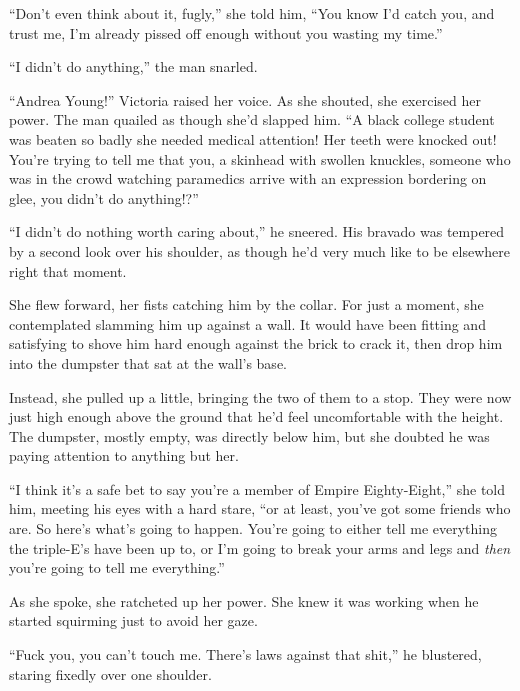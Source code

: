 ``Don't even think about it, fugly,'' she told him, ``You know I'd catch you, and trust me, I'm already pissed off enough without you wasting my time.''



``I didn't do anything,'' the man snarled.



``Andrea Young!'' Victoria raised her voice.  As she shouted, she exercised her power.  The man quailed as though she'd slapped him.  ``A black college student was beaten so badly she needed medical attention!  Her teeth were knocked out!  You're trying to tell me that you, a skinhead with swollen knuckles, someone who was in the crowd watching paramedics arrive with an expression bordering on glee, you didn't do anything!?''



``I didn't do nothing worth caring about,'' he sneered.  His bravado was tempered by a second look over his shoulder, as though he'd very much like to be elsewhere right that moment.



She flew forward, her fists catching him by the collar.  For just a moment, she contemplated slamming him up against a wall.  It would have been fitting and satisfying to shove him hard enough against the brick to crack it, then drop him into the dumpster that sat at the wall's base.



Instead, she pulled up a little, bringing the two of them to a stop.  They were now just high enough above the ground that he'd feel uncomfortable with the height.  The dumpster, mostly empty, was directly below him, but she doubted he was paying attention to anything but her.



``I think it's a safe bet to say you're a member of Empire Eighty-Eight,'' she told him, meeting his eyes with a hard stare, ``or at least, you've got some friends who are.  So here's what's going to happen.  You're going to either tell me everything the triple-E's have been up to, or I'm going to break your arms and legs and \emph{then} you're going to tell me everything.''



As she spoke, she ratcheted up her power.  She knew it was working when he started squirming just to avoid her gaze.



``Fuck you, you can't touch me.  There's laws against that shit,'' he blustered, staring fixedly over one shoulder.



